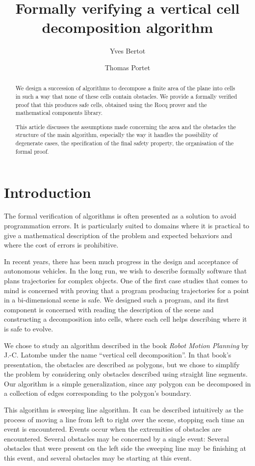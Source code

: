 \documentclass[a4paper, USenglish, cleveref, autoref, thm-restate]{lipics-v2021}
\title{Formally verifying a vertical cell decomposition algorithm}
\author{Yves Bertot}{Inria Center at Université Côte d'Azur, France}
       {yves.bertot@inria.fr}
       {https://orcid.org/0000-0001-5052-3019}{}
\author{Thomas Portet}{Inria Center at Université Côte d'Azur, France}
       {thomas.portet@inria.fr}
       {}{}
\begin{document}
\maketitle

\begin{abstract}
We design a succession of algorithms to decompose a finite area of the
plane into cells in such a way that none of these cells contain obstacles.
We provide a formally verified proof that this produces safe cells,
obtained using the Rocq prover and the mathematical components library.

This article discusses the assumptions made concerning the area and the
obstacles the structure of the main algorithm, especially the way it handles
the possibility of degenerate cases, the specification of the final safety
property, the organisation of the formal proof.
\end{abstract}

\section{Introduction}
The formal verification of algorithms is often presented as a solution
to avoid programmation errors.  It is particularly suited to domains
where it is practical to give a mathematical description of the
problem and expected behaviors and where the cost of errors is
prohibitive.

In recent years, there has been much progress in the design and
acceptance of autonomous vehicles.
In the long run, we wish to describe formally 
software that plans trajectories
for complex objects.  One of the first case studies that comes to mind
is concerned with proving that a program producing trajectories for a
point in a bi-dimensional scene is safe.  We designed such a program,
and its first component is concerned with reading the description of
the scene and constructing a decomposition into cells, where each cell
helps describing where it is safe to evolve.

We chose to study an algorithm described in the book {\em Robot Motion
  Planning} by J.-C. Latombe under the name ``vertical cell
decomposition''.  In that book's presentation, the obstacles are
described as polygons, but we chose to simplify the problem by
considering only obstacles described using straight line segments.
Our algorithm is a simple generalization, since any polygon can be
decomposed in a collection of edges corresponding to the polygon's
boundary.

This algorithm is sweeping line algorithm.  It can be described
intuitively as the process of moving a line from left to right over
the scene, stopping each time an event is encountered.
Events occur when the extremities of obstacles are encountered.
Several obstacles may be concerned by a single event: Several
obstacles that were present on the left side the sweeping line may be
finishing at this event, and several obstacles may be starting at this
event.
\end{document}
